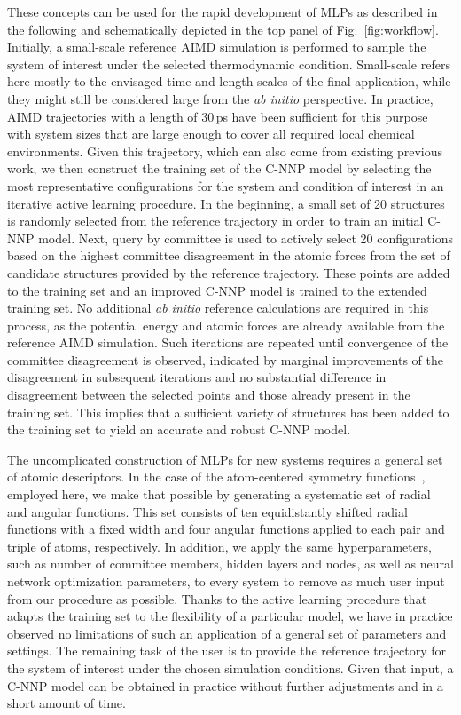 \documentclass[aip,jcp,amsmath,amssymb,floatfix,reprint,citeautoscript,noeprint]{revtex4-1}
\begin{document}
\begin{bibunit}
%
These concepts can be used for the rapid development of MLPs
as described in the following
and schematically depicted in the top panel of Fig.~\ref{fig:workflow}.
%
Initially, a small-scale reference AIMD simulation is performed to sample the system of interest under the selected thermodynamic condition.
%
Small-scale refers here mostly to the envisaged time and length scales of the final application, while they might still be considered large from the \textit{ab initio} perspective.
%
In practice, AIMD trajectories with a length of 30\,ps have been sufficient for this purpose with system sizes that are large enough to cover all required local chemical environments.
%
Given this trajectory, which can also come from existing previous work, we then construct
the training set of the C-NNP model by selecting the most representative
configurations for the system and condition of interest in
an iterative active learning procedure.
%
In the beginning, a small set of 20 structures is randomly selected
from the reference trajectory in order to train an initial C-NNP model.
%
Next, query by committee is used to actively
select 20 configurations based on the highest committee disagreement in the atomic forces
from the set of candidate structures provided by the reference
trajectory.
%
These points are added to the training set and an improved
C-NNP model is trained to the extended training set.
%
No additional \textit{ab initio} reference calculations are required in this process,
as the potential energy and atomic forces are already available from the reference AIMD simulation.
%
Such iterations are repeated until convergence of the committee disagreement is observed, indicated by marginal improvements of the disagreement in subsequent iterations and no substantial difference in disagreement between the selected points and those already present in the training set.
%
This implies that
a sufficient variety of structures has been added to the training set to
yield an accurate and robust C-NNP model.
%


%
The uncomplicated construction of MLPs for new systems
requires a general set
of atomic descriptors.
%
In the case of the atom-centered symmetry functions~\cite{Behler2011/10.1063/1.3553717}, employed here, we
make that possible
by generating a systematic set of radial and angular functions.
%
%
This set consists of ten equidistantly shifted radial functions
with a fixed width and four angular functions
applied to each pair and triple of atoms, respectively.
%
In addition, we apply the same hyperparameters, such as
number of committee members, hidden layers and nodes, 
as well as neural network optimization parameters, to every system
to remove as much user input from our procedure as possible.
%
Thanks to the active learning procedure that adapts
the training set to the flexibility of a particular model,
we have in practice observed no limitations of such an application
of a general set of parameters and settings.
%
The remaining task of the user is to provide the reference
trajectory for the system of interest under the chosen simulation
conditions.
%
Given that input, a C-NNP model
can be obtained in practice without further adjustments
and in a short amount of time.


\end{bibunit}
\end{document}
